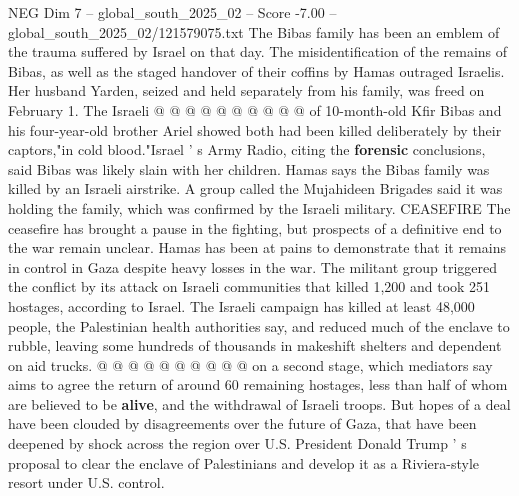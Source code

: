 \begin{textsample}{NEG Dim 7 – global\_south\_2025\_02 – Score -7.00 – global\_south\_2025\_02/121579075.txt}
The Bibas family has been an emblem of the trauma suffered by Israel on that day.
The misidentification of the remains of Bibas, as well as the staged handover of their coffins by Hamas outraged Israelis.
Her husband Yarden, seized and held separately from his family, was freed on February 1.
The Israeli @ @ @ @ @ @ @ @ @ @ of 10-month-old Kfir Bibas and his four-year-old brother Ariel showed both had been killed deliberately by their captors,"in cold blood."Israel ' s Army Radio, citing the \textbf{forensic} conclusions, said Bibas was likely slain with her children.
Hamas says the Bibas family was killed by an Israeli airstrike.
A group called the Mujahideen Brigades said it was holding the family, which was confirmed by the Israeli military.
CEASEFIRE The ceasefire has brought a pause in the fighting, but prospects of a definitive end to the war remain unclear.
Hamas has been at pains to demonstrate that it remains in control in Gaza despite heavy losses in the war.
The militant group triggered the conflict by its attack on Israeli communities that killed 1,200 and took 251 hostages, according to Israel.
The Israeli campaign has killed at least 48,000 people, the Palestinian health authorities say, and reduced much of the enclave to rubble, leaving some hundreds of thousands in makeshift shelters and dependent on aid trucks. @ @ @ @ @ @ @ @ @ @ on a second stage, which mediators say aims to agree the return of around 60 remaining hostages, less than half of whom are believed to be \textbf{alive}, and the withdrawal of Israeli troops.
But hopes of a deal have been clouded by disagreements over the future of Gaza, that have been deepened by shock across the region over U.S.
President Donald Trump ' s proposal to clear the enclave of Palestinians and develop it as a Riviera-style resort under U.S. control.

\end{textsample}
